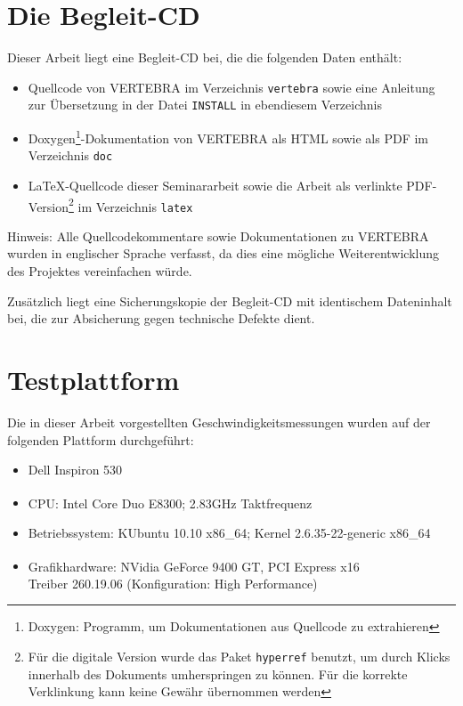 \documentclass[ngerman,pdftex,paper=A4,DIV=calc,titlepage,12pt]{scrartcl}
\newtheorem[L]{boxedDefinition}{Definition}
\begin{document}
\newpage
%
%
\appendix\label{appendixstart}
\section{Die Begleit-CD}
Dieser Arbeit liegt eine Begleit-CD bei, die die folgenden Daten enthält:
\begin{itemize}
 \item Quellcode von VERTEBRA im Verzeichnis \texttt{vertebra} sowie eine Anleitung zur Übersetzung in der Datei \texttt{INSTALL} in ebendiesem Verzeichnis
 \item Doxygen\footnote{Doxygen: Programm, um Dokumentationen aus Quellcode zu extrahieren}-Dokumentation von VERTEBRA als HTML sowie als PDF im Verzeichnis \texttt{doc}
 \item \LaTeX-Quellcode dieser Seminararbeit sowie die Arbeit als verlinkte PDF-Version\footnote{Für die digitale Version wurde das Paket \texttt{hyperref} benutzt, um durch Klicks innerhalb des Dokuments umherspringen zu können. Für die korrekte Verklinkung kann keine Gewähr übernommen werden} im Verzeichnis \texttt{latex} 
\end{itemize}

Hinweis: Alle Quellcodekommentare sowie Dokumentationen zu VERTEBRA wurden in englischer Sprache verfasst, da dies eine mögliche Weiterentwicklung des Projektes vereinfachen würde.

Zusätzlich liegt eine Sicherungskopie der Begleit-CD mit identischem Dateninhalt bei, die zur Absicherung gegen technische Defekte dient.

\section{Testplattform}\label{apdx:testplatform}
Die in dieser Arbeit vorgestellten Geschwindigkeitsmessungen wurden auf der folgenden Plattform durchgeführt:
\begin{itemize}
  \item Dell Inspiron 530
  \item CPU: Intel\textsuperscript{\textregistered} Core Duo E8300; 2.83GHz Taktfrequenz
  \item Betriebssystem: KUbuntu 10.10 x86\_64; Kernel 2.6.35-22-generic x86\_64
  \item Grafikhardware: NVidia\textsuperscript{\textregistered} GeForce 9400 GT, PCI Express x16\\
	Treiber 260.19.06 (Konfiguration: High Performance)
\end{itemize}
\newpage
\end{document}
